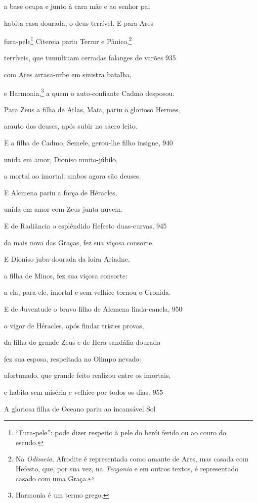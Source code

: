 a base ocupa e junto à cara mãe e ao senhor pai

habita casa dourada, o deus terrível. E para Ares

fura-pele\footnote{``Fura-pele'': pode dizer respeito à pele do herói ferido ou ao
couro do escudo.} Citereia pariu Terror e Pânico,\footnote{Na \emph{Odisseia}, Afrodite é representada como amante de Ares,
mas casada com Hefesto, que, por sua vez, na \emph{Teogonia} e em outros
textos, é representado casado com uma Graça.}

terríveis, que tumultuam cerradas falanges de varões \num{935}

com Ares arrasa-urbe em sinistra batalha,

e Harmonia,\footnote{Harmonia é um termo grego.} a quem o auto-confiante Cadmo desposou.

\quad{}Para Zeus a filha de Atlas, Maia, pariu o glorioso Hermes,

arauto dos deuses, após subir no sacro leito.

\quad{}E a filha de Cadmo, Semele, gerou-lhe filho insigne, \num{940}

unida em amor, Dioniso muito-júbilo,

a mortal ao imortal: ambos agora são deuses.

\quad{}E Alcmena pariu a força de Héracles,

unida em amor com Zeus junta-nuvem.

\quad{}E de Radiância o esplêndido Hefesto duas-curvas, \num{945}

da mais nova das Graças, fez sua viçosa consorte.

\quad{}E Dioniso juba-dourada da loira Ariadne,

a filha de Minos, fez sua viçosa consorte:

a ela, para ele, imortal e sem velhice tornou o Cronida.

\quad{}E de Juventude o bravo filho de Alcmena linda-canela, \num{950}

o vigor de Héracles, após findar tristes provas,

da filha do grande Zeus e de Hera sandália-dourada

fez sua esposa, respeitada no Olimpo nevado:

afortunado, que grande feito realizou entre os imortais,

e habita sem miséria e velhice por todos os dias. \num{955}

\quad{}A gloriosa filha de Oceano pariu ao incansável Sol

